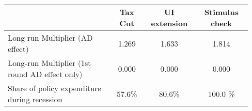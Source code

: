 \begin{tabular}{@{}lccc@{}}
\toprule
& Tax Cut    & UI extension    & Stimulus check    \\  \midrule
Long-run Multiplier (AD effect) &1.269  & 1.633  & 1.814     \\
Long-run Multiplier (1st round AD effect only) &0.000  & 0.000  & 0.000     \\
Share of policy expenditure during recession &57.6\%  & 80.6\%  & 100.0 \%    \\
\end{tabular}
